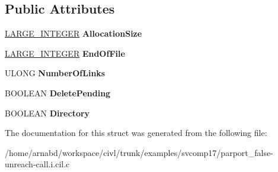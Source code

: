 \subsection*{Public Attributes}
\begin{DoxyCompactItemize}
\item 
\hypertarget{struct__FILE__STANDARD__INFORMATION_ab58b2940f1fbe9e33c3b3670836d5856}{}\hyperlink{union__LARGE__INTEGER}{L\+A\+R\+G\+E\+\_\+\+I\+N\+T\+E\+G\+E\+R} {\bfseries Allocation\+Size}\label{struct__FILE__STANDARD__INFORMATION_ab58b2940f1fbe9e33c3b3670836d5856}

\item 
\hypertarget{struct__FILE__STANDARD__INFORMATION_a010ac9abd90b1824634120f3f579ac36}{}\hyperlink{union__LARGE__INTEGER}{L\+A\+R\+G\+E\+\_\+\+I\+N\+T\+E\+G\+E\+R} {\bfseries End\+Of\+File}\label{struct__FILE__STANDARD__INFORMATION_a010ac9abd90b1824634120f3f579ac36}

\item 
\hypertarget{struct__FILE__STANDARD__INFORMATION_a0ce5ea8999eaf912ea04aa43d8df282c}{}U\+L\+O\+N\+G {\bfseries Number\+Of\+Links}\label{struct__FILE__STANDARD__INFORMATION_a0ce5ea8999eaf912ea04aa43d8df282c}

\item 
\hypertarget{struct__FILE__STANDARD__INFORMATION_aef758f8ad04b58ad5b18174089266e72}{}B\+O\+O\+L\+E\+A\+N {\bfseries Delete\+Pending}\label{struct__FILE__STANDARD__INFORMATION_aef758f8ad04b58ad5b18174089266e72}

\item 
\hypertarget{struct__FILE__STANDARD__INFORMATION_ab52a5485a0ad3a7914a299eca29a79ed}{}B\+O\+O\+L\+E\+A\+N {\bfseries Directory}\label{struct__FILE__STANDARD__INFORMATION_ab52a5485a0ad3a7914a299eca29a79ed}

\end{DoxyCompactItemize}


The documentation for this struct was generated from the following file\+:\begin{DoxyCompactItemize}
\item 
/home/arnabd/workspace/civl/trunk/examples/svcomp17/parport\+\_\+false-\/unreach-\/call.\+i.\+cil.\+c\end{DoxyCompactItemize}
